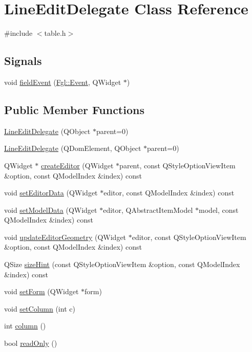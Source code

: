 \hypertarget{classLineEditDelegate}{
\section{LineEditDelegate Class Reference}
\label{classLineEditDelegate}
}


{\ttfamily \#include $<$table.h$>$}

\subsection*{Signals}
\begin{DoxyCompactItemize}
\item 
void \hyperlink{classLineEditDelegate_aef453ff10ab9068948696442b9c2a867}{fieldEvent} (\hyperlink{structFgl_1_1Event}{Fgl::Event}, QWidget $\ast$)
\end{DoxyCompactItemize}
\subsection*{Public Member Functions}
\begin{DoxyCompactItemize}
\item 
\hyperlink{classLineEditDelegate_ab418c36b7c2603193b1365e6d43b4f8f}{LineEditDelegate} (QObject $\ast$parent=0)
\item 
\hyperlink{classLineEditDelegate_ade4fd9d641f292561e65488b1f50d2b0}{LineEditDelegate} (QDomElement, QObject $\ast$parent=0)
\item 
QWidget $\ast$ \hyperlink{classLineEditDelegate_a0134697582deea5baf2627b075e08189}{createEditor} (QWidget $\ast$parent, const QStyleOptionViewItem \&option, const QModelIndex \&index) const 
\item 
void \hyperlink{classLineEditDelegate_a7084c71313b96297c32ecf69e4c52fe0}{setEditorData} (QWidget $\ast$editor, const QModelIndex \&index) const 
\item 
void \hyperlink{classLineEditDelegate_add0abb09725ff1b794825cc428ec36b3}{setModelData} (QWidget $\ast$editor, QAbstractItemModel $\ast$model, const QModelIndex \&index) const 
\item 
void \hyperlink{classLineEditDelegate_a543ae4345264f2e17d75d80c6dcf9f41}{updateEditorGeometry} (QWidget $\ast$editor, const QStyleOptionViewItem \&option, const QModelIndex \&index) const 
\item 
QSize \hyperlink{classLineEditDelegate_a35ced057564e0e83f1cee748c0e4f8c0}{sizeHint} (const QStyleOptionViewItem \&option, const QModelIndex \&index) const 
\item 
void \hyperlink{classLineEditDelegate_a70f070297a44835836592b2dc7e9b38a}{setForm} (QWidget $\ast$form)
\item 
void \hyperlink{classLineEditDelegate_a4aca4a31277cbb989436840eb7371c6e}{setColumn} (int c)
\item 
int \hyperlink{classLineEditDelegate_a1d6c0bec6f2650cd4b6893c7e5c08480}{column} ()
\item 
bool \hyperlink{classLineEditDelegate_a72fc91aa30d6afb7264bd07c356788d0}{readOnly} ()
\end{DoxyCompactItemize}
